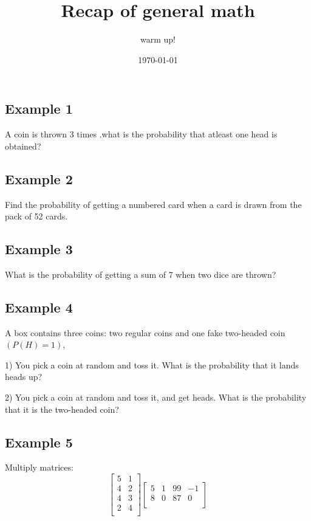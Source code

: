 \documentclass{article}
\title{Recap of general math}
\author{warm up!}
\date{\today}
\begin{document}
	
\maketitle
\subsection{Example 1}
A coin is thrown 3 times .what is the probability that atleast one head is obtained?
	
\subsection{Example 2}

Find the probability of getting a numbered card when a card is drawn from the pack of 52 cards.	
	
\subsection{Example 3}
What is the probability of getting a sum of 7 when two dice are thrown?
	

\subsection{Example 4}
A box contains three coins: two regular coins and one fake two-headed coin $(P(H)=1)$,

1) You pick a coin at random and toss it. What is the probability that it lands heads up?

2) You pick a coin at random and toss it, and get heads. What is the probability that it is the two-headed coin?

\subsection{Example 5}
Multiply matrices:
\begin{equation}
	\left[
	\begin{array}{cc}
		5 & 1 \\
		4 & 2 \\
		4 & 3 \\
		2 & 4 \\  
	\end{array}
	\right]
	\left[
	\begin{array}{cccc}
		 
		5 & 1 & 99 & -1\\
		8 & 0 & 87 & 0\\
		
	\end{array}
\right]
\end{equation}
\end{document}

